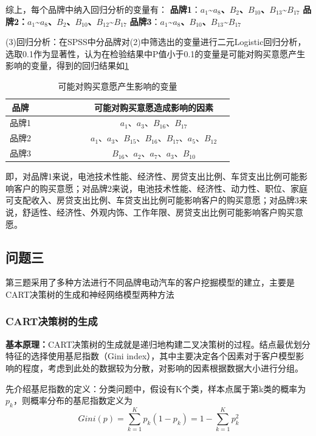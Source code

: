 \documentclass{JXUSTmodeling}
\begin{document}
综上，每个品牌中纳入回归分析的变量有：
\textbf{品牌1}：\textbf{$ a_{1} $\~{}$ a_{8}$、$ B_{2} $、$ B_{10} $、$ B_{13} $\~{}$ B_{17}$}
\textbf{品牌2：}\textbf{$ a_{1} $\~{}$ a_{8}$、$ B_{2} $、$ B_{10} $、$ B_{12} $\~{}$ B_{17}$}
\textbf{品牌3}：\textbf{$ a_{1} $\~{}$ a_{8}$、$ B_{10} $、$ B_{13} $\~{}$ B_{17}$}

(3)回归分析：在SPSS中分品牌对(2)中筛选出的变量进行二元Logistic回归分析，选取0.1作为显著性，认为在检验结果中P值小于0.1的变量是可能对购买意愿产生影响的变量，得到的回归结果如\ref{tab:11}
\begin{table}[htbp]
	\centering 
	\caption{\label{tab:11}可能对购买意愿产生影响的变量}
	\begin{tabular}{ccccccccc}
		\toprule[2pt]
		品牌 &&&&&&& 可能对购买意愿造成影响的因素 \\
		\midrule
		品牌1 &&&&&&& $ a_{1} $、$ a_{3} $、$ B_{16} $、$ B_{17} $\\
		品牌2 &&&&&&& $ a_{1} $、$ a_{3} $、$ B_{15} $、$ B_{16} $、$ B_{17} $、$ a_{5} $、$ B_{12} $\\
		品牌3 &&&&&&& $ B_{16} $、$ a_{2} $、$ a_{7} $、$ a_{3} $、$ B_{10} $\\
	
		
		\bottomrule[2pt]
	\end{tabular}
\end{table}

即，对品牌1来说，电池技术性能、经济性、房贷支出比例、车贷支出比例可能影响客户的购买意愿；对品牌2来说，电池技术性能、经济性、动力性、职位、家庭可支配收入、房贷支出比例、车贷支出比例可能影响客户的购买意愿；对品牌3来说，舒适性、经济性、外观内饰、工作年限、房贷支出比例可能影响客户购买意愿。
\subsection{问题三}\label{sub:5.3}
第三题采用了多种方法进行不同品牌电动汽车的客户挖掘模型的建立，主要是CART决策树的生成和神经网络模型两种方法
\subsubsection{CART决策树的生成}
\textbf{基本原理：}CART决策树的生成就是递归地构建二叉决策树的过程。结点最优划分特征的选择使用基尼指数（Gini index），其中主要决定各个因素对于客户模型影响的程度，考虑到此处的数据较为分散，对影响的因素根据数据大小进行分组。

先介绍基尼指数的定义：分类问题中，假设有K个类，样本点属于第k类的概率为$ p_{k} $，则概率分布的基尼指数定义为
\begin{equation}
	Gini(p)=\sum_{k=1}^{K}p_{k}(1-p_{k})=1-\sum_{k=1}^{K}p_{k}^{2}
\end{equation}
\end{document}
